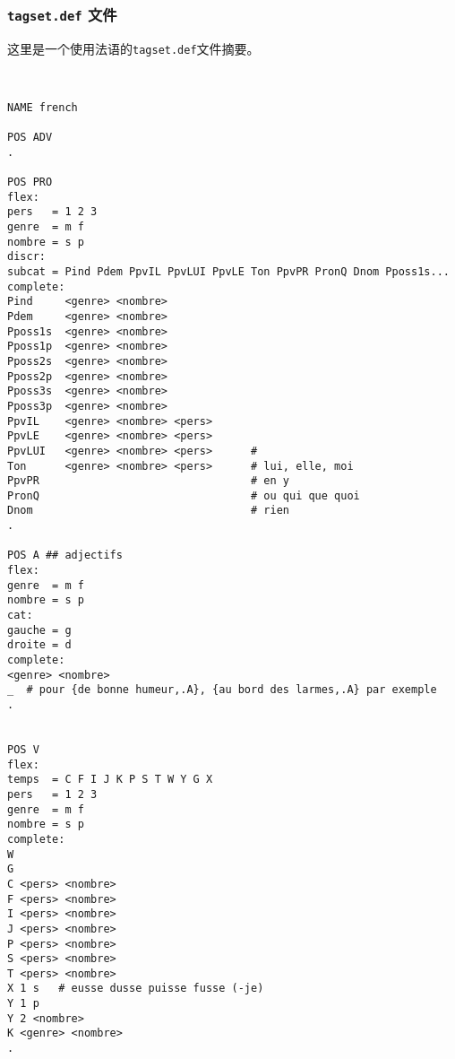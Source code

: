 \subsubsection{\texttt{tagset.def} 文件}
这里是一个使用法语的\verb$tagset.def$文件摘要。


\begin{verbatim}


NAME french

POS ADV
.

POS PRO
flex:
pers   = 1 2 3
genre  = m f
nombre = s p
discr:
subcat = Pind Pdem PpvIL PpvLUI PpvLE Ton PpvPR PronQ Dnom Pposs1s...
complete:
Pind     <genre> <nombre>
Pdem     <genre> <nombre>
Pposs1s  <genre> <nombre>
Pposs1p  <genre> <nombre>
Pposs2s  <genre> <nombre>
Pposs2p  <genre> <nombre>
Pposs3s  <genre> <nombre>
Pposs3p  <genre> <nombre>
PpvIL    <genre> <nombre> <pers>
PpvLE    <genre> <nombre> <pers>
PpvLUI   <genre> <nombre> <pers>      #
Ton      <genre> <nombre> <pers>      # lui, elle, moi
PpvPR                                 # en y
PronQ                                 # ou qui que quoi
Dnom                                  # rien
.

POS A ## adjectifs
flex:
genre  = m f
nombre = s p
cat:
gauche = g
droite = d
complete:
<genre> <nombre>
_  # pour {de bonne humeur,.A}, {au bord des larmes,.A} par exemple
.


POS V
flex:
temps  = C F I J K P S T W Y G X
pers   = 1 2 3
genre  = m f
nombre = s p
complete:
W
G
C <pers> <nombre>
F <pers> <nombre>
I <pers> <nombre>
J <pers> <nombre>
P <pers> <nombre>
S <pers> <nombre>
T <pers> <nombre>
X 1 s   # eusse dusse puisse fusse (-je)
Y 1 p
Y 2 <nombre>
K <genre> <nombre>
.
\end{verbatim}

